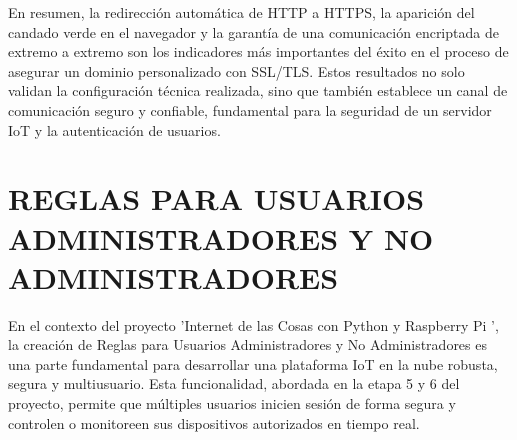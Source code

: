 \documentclass{report}
\begin{document}
En resumen, la redirección automática de HTTP a HTTPS, la aparición del candado verde en el navegador y la garantía de una comunicación 
encriptada de extremo a extremo son los indicadores más importantes del éxito en el proceso de asegurar un dominio personalizado 
con SSL/TLS. Estos resultados no solo validan la configuración técnica realizada, sino que también establece un canal de comunicación 
seguro y confiable, fundamental para la seguridad de un servidor IoT y la autenticación de usuarios.

\chapter{REGLAS PARA USUARIOS ADMINISTRADORES Y NO ADMINISTRADORES}
En el contexto del proyecto  'Internet de las Cosas con Python y Raspberry Pi ', la creación de  Reglas para Usuarios Administradores y No Administradores  
es una parte fundamental para desarrollar una plataforma IoT en la nube robusta, segura y multiusuario. Esta funcionalidad, abordada en la etapa 
5 y 6 del proyecto, permite que múltiples usuarios inicien sesión de forma segura y controlen o monitoreen sus dispositivos autorizados en tiempo real.
\end{document}
